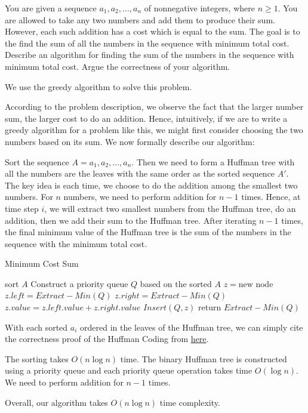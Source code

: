 \newpage
{} %

\problemdes

You are given a sequence $a_1, a_2, \dots, a_n$ of nonnegative integers, where $n \geq 1$. You are allowed to take any two numbers and add them to produce their sum. However, each such addition has a cost which is equal to the sum. The goal is to the find the sum of all the numbers in the sequence with minimum total cost. Describe an algorithm for finding the sum of the numbers in the sequence with minimum total cost. Argue the correctness of your algorithm.

\solution


We use the greedy algorithm to solve this problem.

According to the problem description, we observe the fact that the larger number sum, the larger cost to do an addition. Hence, intuitively, if we are to write a greedy algorithm for a problem like this, we might first consider choosing the two numbers based on its sum. We now formally describe our algorithm:

Sort the sequence $A= a_1, a_2, \dots, a_n$. Then we need to form a Huffman tree with all the numbers are the leaves with the same order as the sorted sequence $A'$. The key idea is each time, we choose to do the addition among the smallest two numbers. For $n$ numbers, we need to perform addition for $n-1$ times. Hence, at time step $i$, we will extract two smallest numbers from the Huffman tree, do an addition, then we add their sum to the Huffman tree. After iterating $n-1$ times, the final minimum value of the Huffman tree is the sum of the numbers in the sequence with the minimum total cost.


\begin{algorithm}[]
  \caption{Minimum Cost Sum}
  sort $A$\;
  Construct a priority queue $Q$ based on the sorted $A$\;
  {
  	$z = \text{new node}$\;
	$z.left =Extract-Min(Q)$\;
	$z.right =Extract-Min(Q)$\;
	$z.value = z.left.value + z.right.value$\;
	$Insert(Q, z)$\;
  }
  return $Extract-Min(Q)$\;
\end{algorithm}


With each sorted $a_i$ ordered in the leaves of the Huffman tree, we can simply cite the correctness proof of the Huffman Coding from \href{http://www.cs.toronto.edu/~vassos/teaching/c73/handouts/huffman.pdf}{here}.


The sorting takes $O(n\log n)$ time. The binary Huffman tree is constructed using a priority queue and each priority queue operation takes time $O(\log n)$. We need to perform addition for $n-1$ times.

Overall, our algorithm takes $O(n\log n)$ time complexity.



